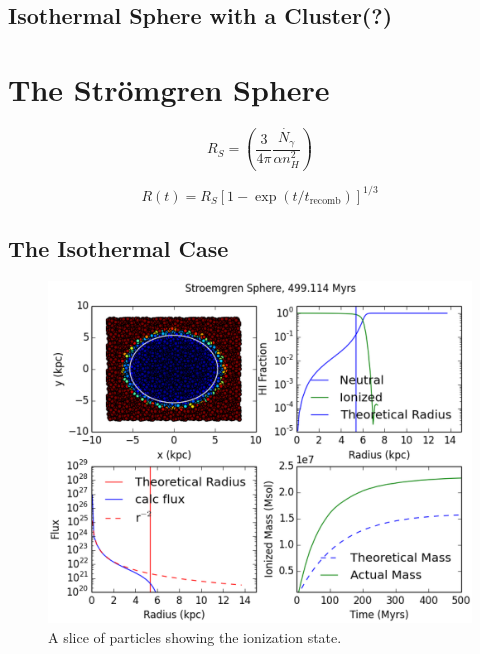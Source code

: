 \subsection{Isothermal Sphere with a Cluster(?)}
\label{sec:cluster}



\section{The Str\"omgren Sphere}
\label{sec:stromgren}

\begin{equation}
\label{eq:strmogrenradius}
R_S = \left( \frac{3}{4\pi} \frac{\dot{N_{\gamma}}}{\alpha n_H^2}\right)
\end{equation}

\begin{equation}
\label{eq:stromgrentime}
R(t) = R_S[1-\exp{(t/t_{\mbox{recomb}})}]^{1/3}
\end{equation}

\subsection{The Isothermal Case}
\label{sec:isostromgren}

\begin{figure}
\includegraphics[width=\textwidth]{graphics/ifront6401000.eps}
\caption[The isothermal Str\"omgren Sphere.]{A slice of particles showing the ionization state.}
\label{fig:stromgreniso}
\end{figure}

